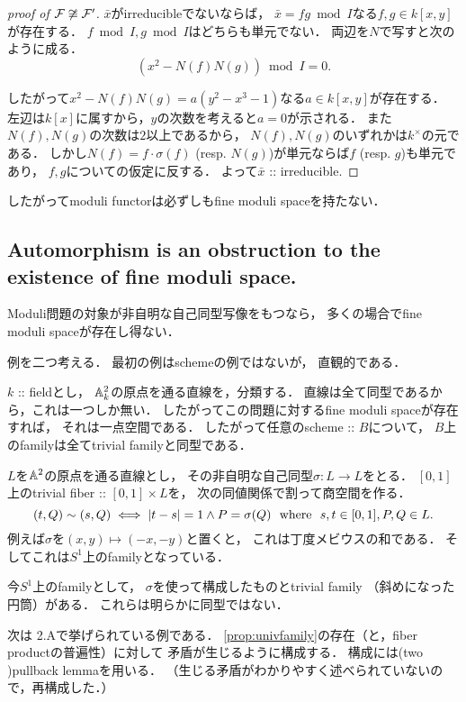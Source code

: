 \documentclass[a4paper]{jsarticle}
\newcommand{\famF}{\mathcal{F}}
\begin{document}
\begin{proof}[proof of $\famF \not \iso \famF'$]
        $\bar{x}$がirreducibleでないならば，
        $\bar{x}=fg \bmod I$なる$f,g \in k[x,y]$が存在する．
        $f \bmod I, g \bmod I$はどちらも単元でない．
        両辺を$N$で写すと次のように成る．
        \[ (x^2-N(f)N(g)) \bmod I=0. \]

        したがって$x^2-N(f)N(g)=a(y^2-x^3-1)$なる$a \in k[x,y]$が存在する．
        左辺は$k[x]$に属すから，$y$の次数を考えると$a=0$が示される．
        また$N(f), N(g)$の次数は$2$以上であるから，
        $N(f), N(g)$のいずれかは$k^{\times}$の元である．
        しかし$N(f)=f \cdot \sigma(f)$ (resp. $N(g)$)が単元ならば$f$ (resp. $g$)も単元であり，
        $f,g$についての仮定に反する．
        よって$\bar{x}$ :: irreducible.
    \end{proof}

    したがってmoduli functorは必ずしもfine moduli spaceを持たない．

    \subsection{Automorphism is an obstruction to the existence of fine moduli space.}
    Moduli問題の対象が非自明な自己同型写像をもつなら，
    多くの場合でfine moduli spaceが存在し得ない．

    例を二つ考える．
    最初の例はschemeの例ではないが，
    直観的である．
    \begin{Example}
        $k$ :: fieldとし，
        $\mathbb{A}^2_k$の原点を通る直線を，分類する．
        直線は全て同型であるから，これは一つしか無い．
        したがってこの問題に対するfine moduli spaceが存在すれば，
        それは一点空間である．
        したがって任意のscheme :: $B$について，
        $B$上のfamilyは全てtrivial familyと同型である．
        
        $L$を$\mathbb{A}^2$の原点を通る直線とし，
        その非自明な自己同型$\sigma: L \to L$をとる．
        $[0,1]$上のtrivial fiber :: $[0,1] \times L$を，
        次の同値関係で割って商空間を作る．
        \[ (t, Q) \sim (s, Q) \iff |t-s|=1 \land P=\sigma(Q) ~~\text{where}~~ s,t \in [0,1], P,Q \in L. \]
        例えば$\sigma$を$(x,y) \mapsto (-x,-y)$と置くと，
        これは丁度メビウスの和である．
        そしてこれは$S^1$上のfamilyとなっている．

        今$S^1$上のfamilyとして，
        $\sigma$を使って構成したものとtrivial family （斜めになった円筒）がある．
        これらは明らかに同型ではない．
    \end{Example}

    次は\cite{HaMo} 2.Aで挙げられている例である．
    \ref{prop:univfamily}の存在（と，fiber productの普遍性）に対して
    矛盾が生じるように構成する．
    構成には(two )pullback lemmaを用いる．
    （生じる矛盾がわかりやすく述べられていないので，再構成した．）
    \begin{Example}
        
    \end{Example}
\end{document}
